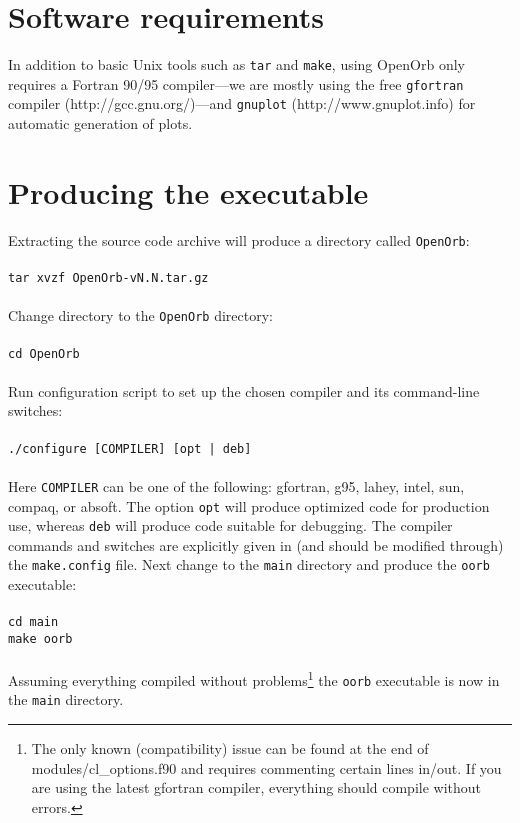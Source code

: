 \documentclass[12pt,english,twoside,a4paper]{report}
\begin{document}
\section{Software requirements}

In addition to basic Unix tools such as \verb|tar| and \verb|make|,
using OpenOrb only requires a Fortran 90/95 compiler---we are mostly
using the free \verb|gfortran| compiler (http://gcc.gnu.org/)---and
\verb|gnuplot| (http://www.gnuplot.info) for automatic generation of
plots.

\section{Producing the executable}

Extracting the source code archive will produce a directory called
\verb|OpenOrb|: \\ \\
\verb|tar xvzf OpenOrb-vN.N.tar.gz|\\ \\
Change directory to the \verb|OpenOrb| directory:\\ \\
\verb|cd OpenOrb|\\ \\
Run configuration script to set up the chosen compiler and its
command-line switches:\\ \\
\verb+./configure [COMPILER] [opt | deb]+\\ \\
Here \verb|COMPILER| can be one of the following: gfortran, g95,
lahey, intel, sun, compaq, or absoft. The option \verb|opt| will
produce optimized code for production use, whereas \verb|deb| will
produce code suitable for debugging. The compiler commands and
switches are explicitly given in (and should be modified through) the
\verb|make.config| file. Next change to the \verb|main| directory and
produce the \verb|oorb| executable: \\ \\
\verb|cd main| \\
\verb|make oorb| \\ \\
Assuming everything compiled without problems\footnote{The only known
  (compatibility) issue can be found at the end of
  \mbox{modules/cl\_options.f90} and requires commenting certain lines
  in/out. If you are using the latest gfortran compiler, everything
  should compile without errors.} the \verb|oorb| executable is now in
the \verb|main| directory.
\end{document}
